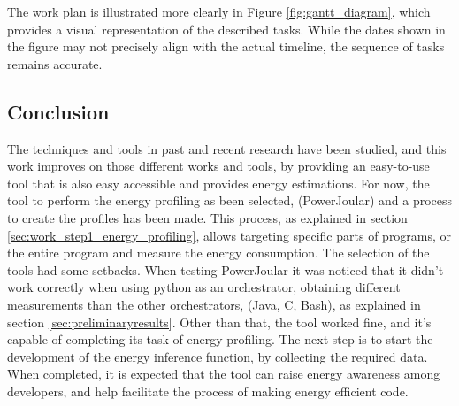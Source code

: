 \documentclass[sigplan]{acmart}
\begin{document}
The work plan is illustrated more clearly in Figure \ref{fig:gantt_diagram}, which provides a visual representation of the described tasks. While the dates shown in the figure may not precisely align with the actual timeline, the sequence of tasks remains accurate.

\subsection{Conclusion}

The techniques and tools in past and recent research have been studied, and this work improves on those different works and tools, by providing an easy-to-use tool that is also easy accessible and provides energy estimations.
For now, the tool to perform the energy profiling as been selected, (PowerJoular) and a process to create the profiles has been made. This process, as explained in section \ref{sec:work_step1_energy_profiling}, allows targeting specific parts of programs, or the entire program and measure the energy consumption. The selection of the tools had some setbacks. When testing PowerJoular it was noticed that it didn't work correctly when using python as an orchestrator, obtaining different measurements than the other orchestrators, (Java, C, Bash), as explained in section \ref{sec:preliminaryresults}. Other than that, the tool worked fine, and it's capable of completing its task of energy profiling. The next step is to start the development of the energy inference function, by collecting the required data. When completed, it is expected that the tool can raise energy awareness among developers, and help facilitate the process of making energy efficient code.


%
%




\end{document}
